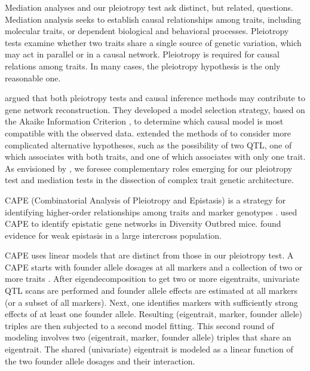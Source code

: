 \documentclass[12pt,twoside, lineno]{gsajnl}
\begin{document}
Mediation analyses and our pleiotropy test ask distinct, but related, questions. Mediation analysis seeks to establish causal relationships among traits, including molecular traits, or dependent biological and behavioral processes. Pleiotropy tests examine whether two traits share a single source of genetic variation, which may act in parallel or in a causal network. Pleiotropy is required for causal relations among traits. In many cases, the pleiotropy hypothesis is the only reasonable one. 

\citet{schadt2005integrative} argued that
both pleiotropy tests and causal inference methods may contribute to gene network
reconstruction. They developed a model selection strategy, based on
the Akaike Information Criterion \citep{akaike1974new}, to determine which
causal model is most compatible with the observed data.
\citet{schadt2005integrative} extended the methods of
\citet{jiang1995multiple} to consider more complicated alternative
hypotheses, such as the possibility of two QTL, one of which
associates with both traits, and one of which associates with only one
trait. As envisioned by \citet{schadt2005integrative}, we foresee
complementary roles emerging for our pleiotropy test
and mediation tests in the dissection of complex trait genetic
architecture.

CAPE (Combinatorial Analysis of Pleiotropy and Epistasis) is a strategy for identifying higher-order relationships among traits and marker genotypes \citep{tyler2013cape}. 
\citet{tyler2017epistatic} used CAPE to identify epistatic gene networks in Diversity Outbred mice. \citet{tyler2016weak} found evidence for weak epistasis in a large intercross population. 

CAPE uses linear models that are distinct from those in our pleiotropy test. 
A CAPE starts with founder allele dosages at all markers and a collection of two or more traits \citep{tyler2017epistatic}. 
After eigendecomposition to get two or more eigentraits, univariate QTL scans are performed and founder allele effects are estimated at all markers (or a subset of all markers). 
Next, one identifies markers with sufficiently strong effects of at least one founder allele. 
Resulting (eigentrait, marker, founder allele) triples are then subjected to a second model fitting. 
This second round of modeling involves two (eigentrait, marker, founder allele) triples that share an eigentrait. 
The shared (univariate) eigentrait is modeled as a linear function of the two founder allele dosages and their interaction. 
\end{document}
